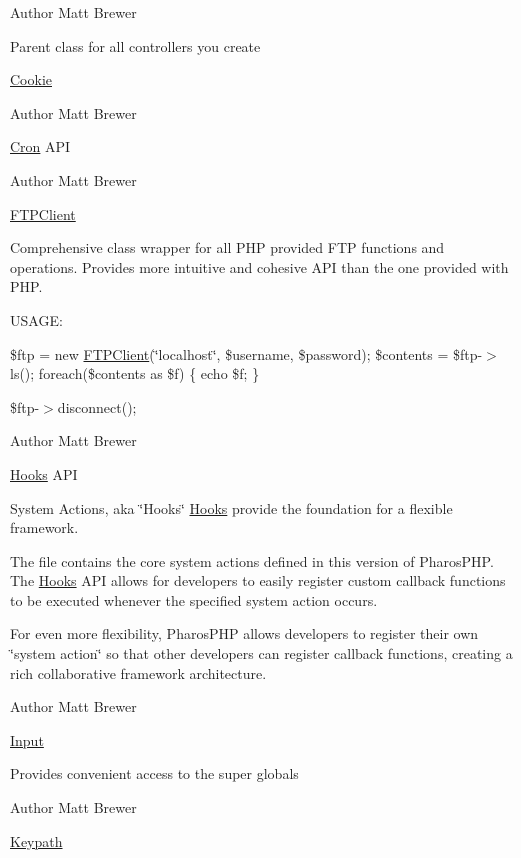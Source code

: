 \begin{DoxyAuthor}{Author}
Matt Brewer
\end{DoxyAuthor}
Parent class for all controllers you create

\hyperlink{class_cookie}{Cookie}

\begin{DoxyAuthor}{Author}
Matt Brewer
\end{DoxyAuthor}
\hyperlink{class_cron}{Cron} API

\begin{DoxyAuthor}{Author}
Matt Brewer
\end{DoxyAuthor}
\hyperlink{class_f_t_p_client}{FTPClient}

Comprehensive class wrapper for all PHP provided FTP functions and operations. Provides more intuitive and cohesive API than the one provided with PHP.

USAGE:

\$ftp = new \hyperlink{class_f_t_p_client}{FTPClient}(\char`\"{}localhost\char`\"{}, \$username, \$password); \$contents = \$ftp-\/$>$ls(); foreach(\$contents as \$f) \{ echo \$f; \}

\$ftp-\/$>$disconnect();

\begin{DoxyAuthor}{Author}
Matt Brewer
\end{DoxyAuthor}
\hyperlink{class_hooks}{Hooks} API

System Actions, aka \char`\"{}Hooks\char`\"{} \hyperlink{class_hooks}{Hooks} provide the foundation for a flexible framework.

The file contains the core system actions defined in this version of PharosPHP. The \hyperlink{class_hooks}{Hooks} API allows for developers to easily register custom callback functions to be executed whenever the specified system action occurs.

For even more flexibility, PharosPHP allows developers to register their own \char`\"{}system action\char`\"{} so that other developers can register callback functions, creating a rich collaborative framework architecture.

\begin{DoxyAuthor}{Author}
Matt Brewer
\end{DoxyAuthor}
\hyperlink{class_input}{Input}

Provides convenient access to the super globals

\begin{DoxyAuthor}{Author}
Matt Brewer
\end{DoxyAuthor}
\hyperlink{class_keypath}{Keypath}

